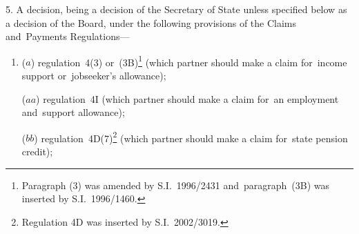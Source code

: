 \documentclass[12pt,a4paper]{article}
\begin{document}
5.  A decision, being a decision of the Secretary of State unless specified below as a decision of the Board, under the following provisions of the Claims and~Payments Regulations—
\begin{enumerate}\item[]

($a$) regulation~4(3) or~(3B)\footnote{Paragraph (3) was amended by S.I.~1996/2431 and~paragraph~(3B) was inserted by S.I.~1996/1460.} (which partner should make a claim for~income support or~jobseeker’s allowance);

($aa$) regulation~4I (which partner should make a claim for~an employment and~support allowance);



($bb$) regulation~4D(7)\footnote{Regulation 4D was inserted by S.I.~2002/3019.} (which partner should make a claim for~state pension credit);

%
%


\end{enumerate}
\end{document}
